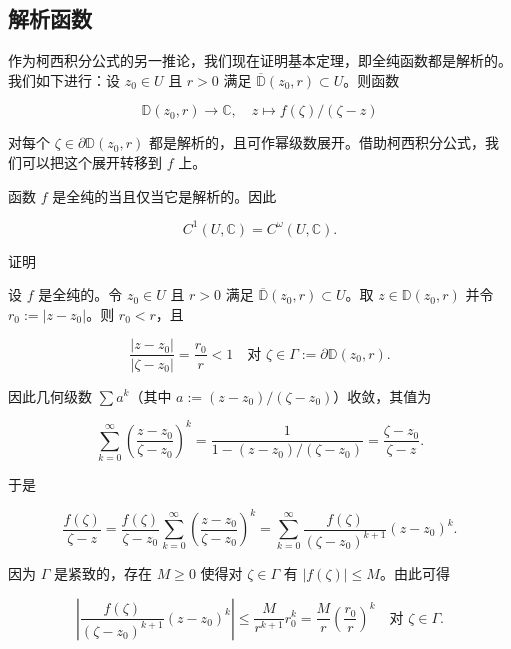 \subsection*{解析函数}

作为柯西积分公式的另一推论，我们现在证明基本定理，即全纯函数都是解析的。我们如下进行：设 $ z_{0} \in U $ 且 $ r > 0 $ 满足 $ \overline{\mathbb{D}}(z_{0},r) \subset U $。则函数

\[
\mathbb{D}(z_{0},r) \to \mathbb{C} , \quad z \mapsto f(\zeta)/(\zeta - z)
\]

对每个 $ \zeta \in \partial\mathbb{D}(z_{0},r) $ 都是解析的，且可作幂级数展开。借助柯西积分公式，我们可以把这个展开转移到 $ f $ 上。

\begin{theorem}

函数 $ f $ 是全纯的当且仅当它是解析的。因此

\[
C^{1}(U,\mathbb{C}) = C^{\omega}(U,\mathbb{C}) .
\]

证明

\begin{subitems}
\item

设 $ f $ 是全纯的。令 $ z_{0} \in U $ 且 $ r > 0 $ 满足 $ \overline{\mathbb{D}}(z_{0},r) \subset U $。取 $ z \in \mathbb{D}(z_{0},r) $ 并令 $ r_{0} := |z - z_{0}| $。则 $ r_{0} < r $，且

\[
\frac{|z - z_{0}|}{|\zeta - z_{0}|} = \frac{r_{0}}{r} < 1 \quad \text{对 } \zeta \in \Gamma := \partial\mathbb{D}(z_{0},r) .
\]

因此几何级数 $ \sum a^{k} $（其中 $ a := (z - z_{0})/(\zeta - z_{0}) $）收敛，其值为

\[
\sum_{k=0}^{\infty}\left(\frac{z - z_{0}}{\zeta - z_{0}}\right)^{k} = \frac{1}{1 - (z - z_{0})/(\zeta - z_{0})} = \frac{\zeta - z_{0}}{\zeta - z} .
\]

于是

\begin{equation}
\frac{f(\zeta)}{\zeta - z} = \frac{f(\zeta)}{\zeta - z_{0}}\sum_{k=0}^{\infty}\left(\frac{z - z_{0}}{\zeta - z_{0}}\right)^{k} = \sum_{k=0}^{\infty}\frac{f(\zeta)}{(\zeta - z_{0})^{k+1}}(z - z_{0})^{k} .\tag{5.5}
\end{equation}

因为 $ \Gamma $ 是紧致的，存在 $ M \ge 0 $ 使得对 $ \zeta \in \Gamma $ 有 $ |f(\zeta)| \le M $。由此可得

\[
\left|\frac{f(\zeta)}{(\zeta - z_{0})^{k+1}}(z - z_{0})^{k}\right| \le \frac{M}{r^{k+1}}r_{0}^{k} = \frac{M}{r}\left(\frac{r_{0}}{r}\right)^{k} \quad \text{对 } \zeta \in \Gamma .
\]


\end{subitems}
\end{theorem}
